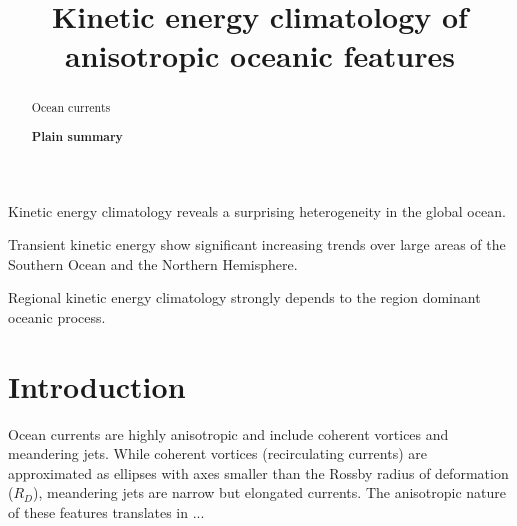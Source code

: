 \documentclass[draft]{agujournal2019}
\begin{document}
\title{Kinetic energy climatology of anisotropic oceanic features}





\begin{keypoints}
	\item Kinetic energy climatology reveals a surprising heterogeneity in the global ocean.
	\item Transient kinetic energy show significant increasing trends over large areas of the Southern Ocean and the Northern Hemisphere.
	\item Regional kinetic energy climatology strongly depends to the region dominant oceanic process.
\end{keypoints}


\begin{abstract}
	
	Ocean currents 

	\noindent\textbf{Plain summary}
	
\end{abstract}	
	
\section{Introduction}

Ocean currents are highly anisotropic and include coherent vortices and meandering jets. While coherent vortices (recirculating currents) are approximated as ellipses with axes smaller than the Rossby radius of deformation ($R_D$), meandering jets are narrow but elongated currents. The anisotropic nature of these features translates in ...
\end{document}
